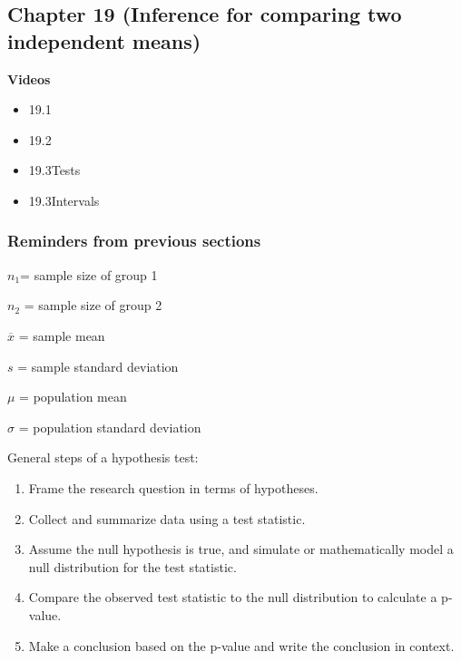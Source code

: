 \documentclass[
]{report}
\providecommand{\tightlist}{%
  \setlength{\itemsep}{0pt}\setlength{\parskip}{0pt}}
\begin{document}
\hypertarget{chapter-19-inference-for-comparing-two-independent-means}{%
\subsection*{Chapter 19 (Inference for comparing two independent means)}\label{chapter-19-inference-for-comparing-two-independent-means}}

\textbf{Videos}

\begin{itemize}
\tightlist
\item
  19.1
\item
  19.2
\item
  19.3Tests
\item
  19.3Intervals
\end{itemize}


\hypertarget{reminders-from-previous-sections-10}{%
\subsubsection*{Reminders from previous sections}\label{reminders-from-previous-sections-10}}

\(n_1\)= sample size of group 1

\(n_2\) = sample size of group 2

\(\overline{x}\) = sample mean

\(s\) = sample standard deviation

\(\mu\) = population mean

\(\sigma\) = population standard deviation

General steps of a hypothesis test:

\begin{enumerate}
\def\labelenumi{\arabic{enumi}.}
\item
  Frame the research question in terms of hypotheses.
\item
  Collect and summarize data using a test statistic.
\item
  Assume the null hypothesis is true, and simulate or mathematically model a null distribution for the test statistic.
\item
  Compare the observed test statistic to the null distribution to calculate a p-value.
\item
  Make a conclusion based on the p-value and write the conclusion in context.
\end{enumerate}
\end{document}
